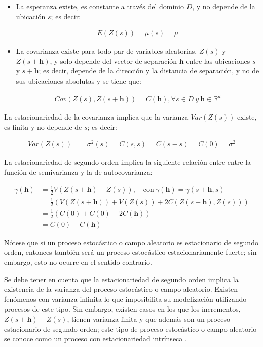 \documentclass[
]{book}
\begin{document}
\begin{itemize}
\item
  La esperanza existe, es constante a través del dominio \(D\), y no depende de la ubicación \(s\); es decir:

  \begin{align}
      E(Z(s))=\mu(s)=\mu  
    \end{align}
\item
  La covarianza existe para todo par de variables aleatorias, \(Z(s)\) y \(Z(s+\textbf{h})\), y solo depende del vector de separación \(\textbf{h}\) entre las ubicaciones \(s\) y \(s+\textbf{h}\); es decir, depende de la dirección y la distancia de separación, y no de sus ubicaciones absolutas y se tiene que:

  \begin{align}
      Cov(Z(s),Z(s+\textbf{h}))=C(\textbf{h}),\forall s\in D \ y\ \textbf{h}\in \mathbb{R}^d  
    \end{align}
\end{itemize}

La estacionariedad de la covarianza implica que la varianza \(Var(Z(s))\) existe, es finita y no depende de \(s\); es decir:

\begin{align}
        Var(Z(s))&=\sigma^2(s)=C(s,s)=C(s-s)=C(0)=\sigma^2  
\end{align}

La estacionariedad de segundo orden implica la siguiente relación entre entre la función de semivarianza y la de autocovarianza:

\begin{align}
    \gamma(\textbf{h})&=\frac{1}{2}V(Z(s+\textbf{h})-Z(s)), \quad \text{con} \ \gamma(\textbf{h})=\gamma(s+\textbf{h},s)\\
&=\frac{1}{2}(V(Z(s+\textbf{h}))+V(Z(s))+2C(Z(s+\textbf{h}),Z(s)))\\
&=\frac{1}{2}(C(0)+C(0)+2C(\textbf{h}))\\
&=C(0)-C(\textbf{h})
\end{align}

Nótese que si un proceso estocástico o campo aleatorio es estacionario de segundo orden, entonces también será un proceso estocástico estacionariamente fuerte; sin embargo, esto no ocurre en el sentido contrario.

Se debe tener en cuenta que la estacionariedad de segundo orden implica la existencia de la varianza del proceso estocástico o campo aleatorio. Existen fenómenos con varianza infinita lo que imposibilita su modelización utilizando procesos de este tipo. Sin embargo, existen casos en los que los incrementos, \(Z(s+\textbf{h})-Z(s)\), tienen varianza finita y que además son un proceso estacionario de segundo orden; este tipo de proceso estocástico o campo aleatorio se conoce como un proceso con estacionariedad intrínseca \citep{montero}.
\end{document}
